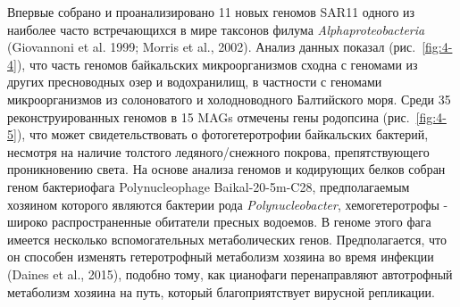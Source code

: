 \documentclass[a4paper,12pt,openany,final]{extreport}
\begin{document}
Впервые собрано и проанализировано 11 новых геномов SAR11 одного из
наиболее часто встречающихся в мире таксонов филума
\emph{Alphaproteobacteria} (Giovannoni et al. 1999; Morris et al.,
2002). Анализ данных показал (рис.~\ref{fig:4-4}), что часть геномов байкальских
микроорганизмов сходна с геномами из других пресноводных озер и
водохранилищ, в частности с геномами микроорганизмов из солоноватого и
холодноводного Балтийского моря. Среди 35 реконструированных геномов в
15 MAGs отмечены гены родопсина (рис.~\ref{fig:4-5}), что может свидетельствовать
о фотогетеротрофии байкальских бактерий, несмотря на наличие толстого
ледяного/снежного покрова, препятствующего проникновению света. На
основе анализа геномов и кодирующих белков собран геном бактериофага
Polynucleophage Baikal-20-5m-C28, предполагаемым хозяином которого
являются бактерии рода \emph{Polynucleobacter}, хемогетеротрофы - широко
распространенные обитатели пресных водоемов. В геноме этого фага имеется
несколько вспомогательных метаболических генов. Предполагается, что он
способен изменять гетеротрофный метаболизм хозяина во время инфекции
(Daines et al., 2015), подобно тому, как цианофаги перенаправляют
автотрофный метаболизм хозяина на путь, который благоприятствует
вирусной репликации.
\end{document}
